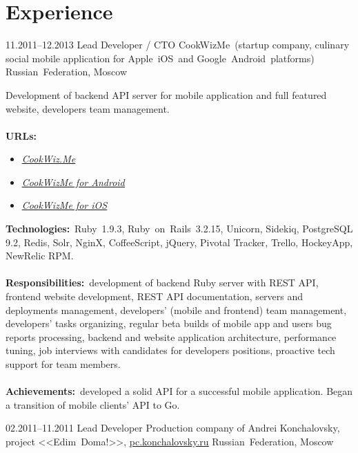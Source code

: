 \documentclass[12pt,a4paper,final]{moderncv}
\begin{document}
\section{Experience}
\cventry
{11.2011--12.2013}
{Lead Developer / CTO}
{CookWizMe~(startup company, culinary social mobile application for Apple~iOS~and Google~Android~platforms)}
{Russian~Federation, Moscow}
{}
{
  Development of backend API server for mobile application and full featured website, developers team management.
  \\\\
  \textbf{URLs:}
  \begin{itemize}
    \item \underline{\href{https://cookwiz.me/}{\itshape CookWiz.Me}}
    \item \underline{\href{https://play.google.com/store/apps/details?id=com.cookwizme}{\itshape CookWizMe for Android}}
    \item \underline{\href{https://itunes.apple.com/app/id605764643}{\itshape CookWizMe for iOS}}
  \end{itemize}
  \bigskip
  \textbf{Technologies:}~Ruby~1.9.3, Ruby~on~Rails~3.2.15, Unicorn, Sidekiq, PostgreSQL 9.2, Redis, Solr, NginX, CoffeeScript, jQuery, Pivotal Tracker, Trello, HockeyApp, NewRelic RPM.
  \\\\
  \textbf{Responsibilities:}~development of backend Ruby server with REST API, frontend website development, REST API documentation, servers and deployments management, developers' (mobile and frontend) team management, developers' tasks organizing, regular beta builds of mobile app and users bug reports processing, backend and website application architecture, performance tuning, job interviews with candidates for developers positions, proactive tech support for team members.
  \\\\
  \textbf{Achievements:}~developed a solid API for a successful mobile application. Began a transition of mobile clients' API to Go.
}
%
\cventry
{02.2011--11.2011}
{Lead Developer}
{
  Production company of Andrei Konchalovsky, project <<Edim~Doma!>>, \underline{\href{http://pc.konchalovsky.ru}{pc.konchalovsky.ru}}
}
{Russian~Federation, Moscow}
{}
\end{document}
